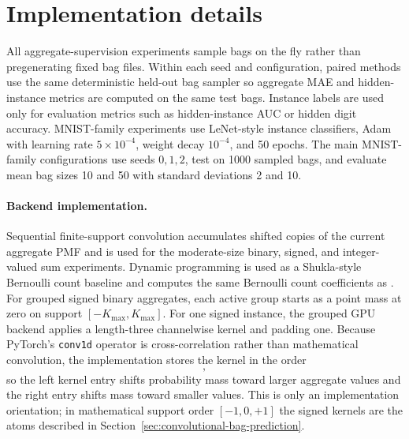 \section{Implementation details}
\label{app:implementation-details}

All aggregate-supervision experiments sample bags on the fly rather than pregenerating fixed bag files.
Within each seed and configuration, paired methods use the same deterministic held-out bag sampler so aggregate MAE and hidden-instance metrics are computed on the same test bags.
Instance labels are used only for evaluation metrics such as hidden-instance AUC or hidden digit accuracy.
MNIST-family experiments use LeNet-style instance classifiers, Adam with learning rate $5\times 10^{-4}$, weight decay $10^{-4}$, and 50 epochs.
The main MNIST-family configurations use seeds $0,1,2$, test on 1000 sampled bags, and evaluate mean bag sizes 10 and 50 with standard deviations 2 and 10.

\paragraph{Backend implementation.}
Sequential finite-support convolution accumulates shifted copies of the current aggregate PMF and is used for the moderate-size binary, signed, and integer-valued sum experiments.
Dynamic programming is used as a Shukla-style Bernoulli count baseline and computes the same Bernoulli count coefficients as \method{}.
For grouped signed binary aggregates, each active group starts as a point mass at zero on support $[-K_{\max},K_{\max}]$.
For one signed instance, the grouped GPU backend applies a length-three channelwise kernel and padding one.
Because PyTorch's \texttt{conv1d} operator is cross-correlation rather than mathematical convolution, the implementation stores the kernel in the order
\begin{equation}
  [p_i\mathbf{1}\{s_i=+1\},\;1-p_i,\;p_i\mathbf{1}\{s_i=-1\}],
\end{equation}
so the left kernel entry shifts probability mass toward larger aggregate values and the right entry shifts mass toward smaller values.
This is only an implementation orientation; in mathematical support order $[-1,0,+1]$ the signed kernels are the atoms described in Section~\ref{sec:convolutional-bag-prediction}.

